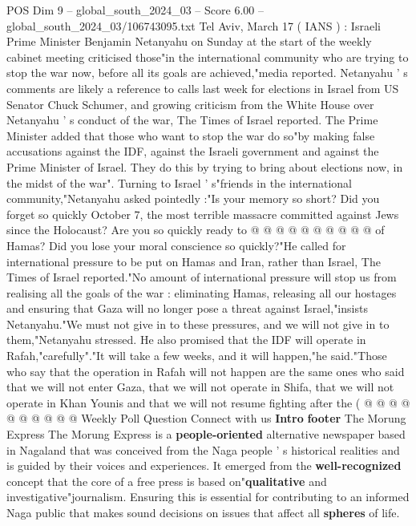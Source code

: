 \begin{textsample}{POS Dim 9 – global\_south\_2024\_03 – Score 6.00 – global\_south\_2024\_03/106743095.txt}  \label{ex:f9_pos_044}
Tel Aviv, March 17 ( IANS ) : Israeli Prime Minister Benjamin Netanyahu on Sunday at the start of the weekly cabinet meeting criticised those"in the international community who are trying to stop the war now, before all its goals are achieved,"media reported.
Netanyahu ' s comments are likely a reference to calls last week for elections in Israel from US Senator Chuck Schumer, and growing criticism from the White House over Netanyahu ' s conduct of the war, The Times of Israel reported.
The Prime Minister added that those who want to stop the war do so"by making false accusations against the IDF, against the Israeli government and against the Prime Minister of Israel.
They do this by trying to bring about elections now, in the midst of the war".
Turning to Israel ' s"friends in the international community,"Netanyahu asked pointedly :"Is your memory so short?
Did you forget so quickly October 7, the most terrible massacre committed against Jews since the Holocaust?
Are you so quickly ready to @ @ @ @ @ @ @ @ @ @ of Hamas?
Did you lose your moral conscience so quickly?"He called for international pressure to be put on Hamas and Iran, rather than Israel, The Times of Israel reported."No amount of international pressure will stop us from realising all the goals of the war : eliminating Hamas, releasing all our hostages and ensuring that Gaza will no longer pose a threat against Israel,"insists Netanyahu."We must not give in to these pressures, and we will not give in to them,"Netanyahu stressed.
He also promised that the IDF will operate in Rafah,"carefully"."It will take a few weeks, and it will happen,"he said."Those who say that the operation in Rafah will not happen are the same ones who said that we will not enter Gaza, that we will not operate in Shifa, that we will not operate in Khan Younis and that we will not resume fighting after the ( @ @ @ @ @ @ @ @ @ @ Weekly Poll Question Connect with us \textbf{Intro} \textbf{footer} The Morung Express The Morung Express is a \textbf{people-oriented} alternative newspaper based in Nagaland that was conceived from the Naga people ' s historical realities and is guided by their voices and experiences.
It emerged from the \textbf{well-recognized} concept that the core of a free press is based on"\textbf{qualitative} and investigative"journalism.
Ensuring this is essential for contributing to an informed Naga public that makes sound decisions on issues that affect all \textbf{spheres} of life.

\end{textsample}
